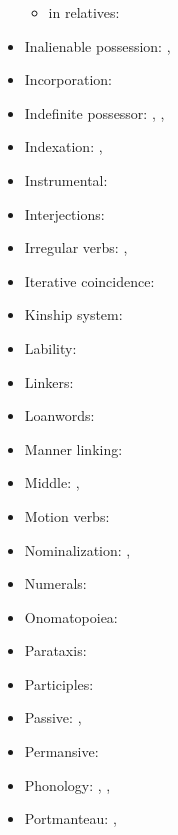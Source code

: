 \documentclass[oldfontcommands,oneside,a4paper,11pt]{article}
\begin{document}
\begin{itemize}
\begin{itemize}
\item in relatives: \citet[275]{japhug14ideophones}
\end{itemize}
\item Inalienable possession: \citet[4]{jacques14antipassive}, \citet{jacques17generic}
\item Incorporation: \citet{jacques12incorp}
\item Indefinite possessor: \citet[1212]{jacques12incorp}, \citet[4]{jacques14antipassive}, \citet{jacques17generic}
\item Indexation: \citet{jacques10inverse}, \citet[85]{jacques12agreement}
\item Instrumental: \citet{jacques16comparative}
\item Interjections: \citet[283]{japhug14ideophones}
\item Irregular verbs: \citet[91]{jacques12agreement}, \citet[1215]{jacques12incorp}
\item Iterative coincidence: \citet[296]{jacques14linking}
\item Kinship system: \citet{jacques11kinship}
\item Lability: \citet[216-9]{jacques12demotion}
\item Linkers:  \citet[276-7]{jacques14linking}
\item Loanwords: \citet[83-199]{jacques04these}
\item Manner linking:  \citet[320-5]{jacques14linking}
\item Middle:  \citet{jacques12demotion}, \citet{jacques15spontaneous}
\item Motion verbs: \citet[201-6]{jacques13harmonization}
\item Nominalization: \citet[5-7]{jacques14antipassive}, \citet{jacques16relatives}
\item Numerals: \citet[4]{jacques14antipassive}
\item Onomatopoiea:   \citet[282]{japhug14ideophones}
\item Parataxis:  \citet[312;315]{jacques14linking}
\item Participles: \citet[5-6]{jacques14antipassive}
\item Passive: \citet{jacques07passif}, \citet[208-13]{jacques12demotion}
\item Permansive: \citet{jacques15spontaneous}
\item Phonology: \citet[12-82]{jacques04these}, \citet{jacques08}, \citet{jacques17ipa}
\item Portmanteau: \citet[136-7]{jacques10inverse}, \citet{jacques17generic}

\end{itemize}
\end{document}
